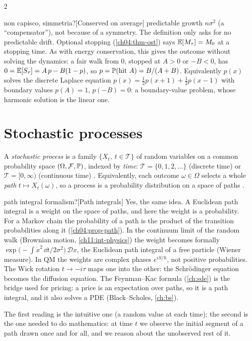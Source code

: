 \begin{paracol}{2}
\begin{answer}{non capisco, simmetria?}[Conserved on average]
predictable growth $n\sigma^2$ (a ``compensator''), not because of a symmetry. The definition only asks
for no predictable drift.
Optional stopping (\cref{ch04:thm-ost}) says $\mathbb{E}[M_\tau]=M_0$ at a stopping time. As with energy
conservation, this gives the outcome without solving the dynamics: a fair walk from $0$, stopped at $A>0$
or $-B<0$, has $0=\mathbb{E}[S_\tau]=A\,p-B(1-p)$, so $p=\mathbb{P}(\text{hit }A)=B/(A+B)$. Equivalently $p(x)$ solves
the discrete Laplace equation $p(x)=\tfrac12p(x+1)+\tfrac12p(x-1)$ with boundary values $p(A)=1$,
$p(-B)=0$: a boundary-value problem, whose harmonic solution is the linear one.
\end{answer}

\section{Stochastic processes}\label{ch04:sec-processes}

\begin{definition}
A \emph{stochastic process} is a family $\{X_t,\ t\in\mathcal T\}$ of random variables on a common
probability space $(\Omega,\mathcal F,\mathbb{P})$, indexed by \emph{time}: $\mathcal T=\{0,1,2,\dots\}$
(discrete time) or $\mathcal T=[0,\infty)$ (continuous time) . Equivalently, each outcome
$\omega\in\Omega$ selects a whole \emph{path} $t\mapsto X_t(\omega)$, so a process is a probability
distribution on a space of paths .
\end{definition}
\begin{answer}{path integral formalism?}[Path integrals]
Yes, the same idea. A Euclidean path integral is a weight on the space of paths, and here the weight is a
probability. For a Markov chain the probability of a path is the product of the transition probabilities
along it (\cref{ch04:prop-path}). In the continuum limit of the random walk (Brownian motion,
\cref{ch11:int-physics}) the weight becomes formally $\exp\bigl(-\int\dot x^2\,\dd t/2\sigma^2\bigr)\,\mathcal Dx$, the
Euclidean path integral of a free particle (Wiener measure).
In QM the weights are complex phases $e^{iS/\hbar}$, not positive probabilities. The Wick rotation
$t\to-i\tau$ maps one into the other: the Schr\"odinger equation becomes the diffusion equation.
The Feynman--Kac formula (\cref{ch:sde}) is the bridge used for pricing: a price is an expectation over
paths, so it is a path integral, and it also solves a PDE (Black--Scholes, \cref{ch:bs}).
\end{answer}
The first reading is the intuitive one (a random value at each time); the second is the one needed to do
mathematics: at time $t$ we observe the initial segment of a path drawn once and for all, and we reason
about the unobserved rest of it.


\end{paracol}
